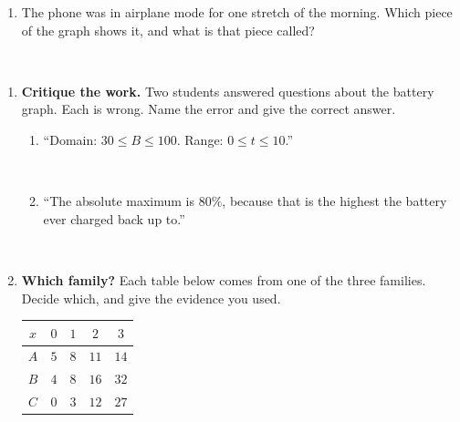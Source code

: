 \documentclass[10pt]{article}
\begin{document}
\begin{tcolorbox}[colback=white, colframe=black!40,
    title=\textbf{Tier A --- Approaching Proficiency},
    fonttitle=\bfseries, arc=2mm, left=3mm, right=3mm, top=2mm, bottom=2mm, breakable]
\begin{enumerate}[leftmargin=1.6em, itemsep=4pt, topsep=2pt]
  \item The phone was in airplane mode for one stretch of the morning. Which piece of the graph
        shows it, and what is that piece called?

\\
\end{enumerate}
\end{tcolorbox}

\vspace{0.10in}

\boxguard[30]
\begin{tcolorbox}[colback=white, colframe=black!40, title=\textbf{Tier E --- Extension},
    fonttitle=\bfseries, arc=2mm, left=3mm, right=3mm, top=2mm, bottom=2mm, breakable]
\small

\begin{enumerate}[leftmargin=1.6em, itemsep=4pt, topsep=2pt]
  \item \textbf{Critique the work.} Two students answered questions about the battery graph.
        Each is wrong. Name the error and give the correct answer.
        \begin{enumerate}[label=(\alph*), leftmargin=1.6em, itemsep=3pt, topsep=3pt]
          \item ``Domain: $30 \le B \le 100$. \quad Range: $0 \le t \le 10$.''

\\

          \item ``The absolute maximum is $80\%$, because that is the highest the battery ever
                charged back up to.''

\\
        \end{enumerate}

  \item \textbf{Which family?} Each table below comes from one of the three families. Decide
        which, and give the evidence you used.
        \smallskip

        \renewcommand{\arraystretch}{1.25}
        \begin{tabular}{@{}|c|c|c|c|c|@{}}
        \hline
        $x$ & $0$ & $1$ & $2$ & $3$ \\ \hline
        $A$ & $5$ & $8$ & $11$ & $14$ \\ \hline
        $B$ & $4$ & $8$ & $16$ & $32$ \\ \hline
        $C$ & $0$ & $3$ & $12$ & $27$ \\ \hline
        \end{tabular}
        \smallskip


\end{enumerate}
\end{tcolorbox}
\end{document}
